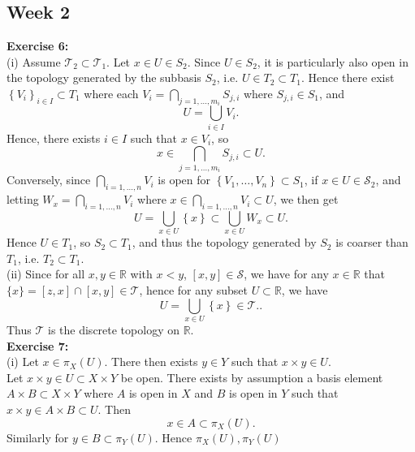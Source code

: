 \documentclass[a4paper]{article}
\begin{document}
        \subsection{Week 2}
        \textbf{Exercise 6:}\\
        (i) Assume $\mathcal{T}_2 \subset \mathcal{T}_1$. Let $x \in U \in S_2$.
        Since $U \in S_2$, it is particularly also open in the topology
        generated by the subbasis $S_2$, i.e. $U \in T_2 \subset T_1$. Hence
        there exist $\left\{ V_i \right\}_{i \in I} \subset T_1 $ where
        each $V_i = \bigcap_{j=1, \ldots, m_i} S_{j,i}$ where
        $S_{j,i} \in S_1$, and
         \[
        U = \bigcup_{i \in  I} V_i
        .\] 
        Hence, there exists $i \in I$ such that $x \in V_i$, so
        \[
        x \in \bigcap_{j=1, \ldots, m_i} S_{j,i} \subset U
        .\] 
        Conversely, since $\bigcap_{i= 1, \ldots, n} V_i$ is open for
        $\left\{ V_1, \ldots, V_n \right\} \subset S_1$, if $ x \in U \in
        \mathcal{S}_2$, and letting
        $W_x = \bigcap_{i= 1, \ldots, n} V_i$ where
        $x \in \bigcap_{i = 1, \ldots, n} V_i \subset U$, we then get
        \[
        U = \bigcup_{x \in U} \left\{ x \right\} 
        \subset \bigcup_{x \in U} W_x
        \subset U
        .\] 
        Hence
        $U \in T_1$, so $S_2 \subset T_1$, and thus the topology generated by
        $S_2$ is coarser than $T_1$, i.e. $T_2 \subset T_1$.\\
        \linebreak
        (ii) Since for all $x,y \in \mathbb{R}$ with $x<y$,
        $[x,y] \in \mathcal{S}$, we have for any $x \in \mathbb{R}$ that
        $\{x\} = [z,x] \cap [x,y] \in \mathcal{T}$, hence for any subset $
        U \subset \mathbb{R}$, we have
        \[
        U = \bigcup_{x \in U} \left\{ x \right\} \in \mathcal{T}.
        .\] 
        Thus $\mathcal{T}$ is the discrete topology on $\mathbb{R}$.\\
        \linebreak
        \textbf{Exercise 7:} \\
        (i) Let $x \in \pi_X (U)$. There then exists $y \in Y$ such that
        $x \times y \in U$.\\
        Let $x \times y \in U \subset X \times Y$ be open. There exists by
        assumption a basis element $A \times B \subset X \times Y$ where
        $A$ is open in $X$ and $B$ is open in $Y$ such that
        $x \times y \in A \times B \subset U$. Then
         \[
        x \in A \subset \pi_X (U)
        .\] 
        Similarly for $y \in B \subset \pi_Y (U)$. Hence $\pi_X(U), \pi_Y(U)$ 
\end{document}
